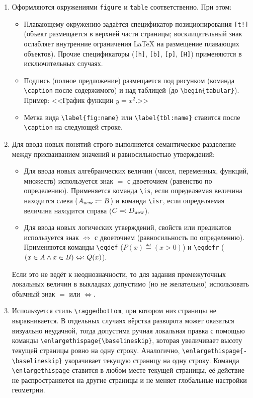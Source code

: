 \begin{enumerate}
    \item {}
        Оформляются окружениями \verb|figure| и \verb|table| соответственно.
        При этом:
        \begin{itemize}
            \item Плавающему окружению задаётся спецификатор позиционирования \verb|[t!]| (объект размещается в верхней части страницы; восклицательный знак ослабляет внутренние ограничения LaTeX на размещение плавающих объектов).
                Прочие спецификаторы (\verb|[h]|, \verb|[b]|, \verb|[p]|, \verb|[H]|) применяются в исключительных случаях.
            \item Подпись (полное предложение) размещается под рисунком (команда \verb|\caption| после содержимого) и над таблицей (до \verb|\begin{tabular}|).
                Пример: <<График функции $y = x^2$.>>
            \item Метка вида \verb|\label{fig:name}| или \verb|\label{tbl:name}| ставится после \verb|\caption| на следующей строке.
        \end{itemize}

    \item {}
        Для ввода новых понятий строго выполняется семантическое разделение между присваиванием значений и равносильностью утверждений:
        \begin{itemize}
            \item Для ввода новых алгебраических величин (чисел, переменных, функций, множеств) используется знак $=$ с двоеточием (равенство по определению).
                Применяется команда \verb|\is|, если определяемая величина находится слева ($A_{\mathrm{new}} \coloneqq B$) и команда \verb|\isr|, если определяемая величина находится справа ($C \eqqcolon D_{\mathrm{new}}$).
            \item Для ввода новых логических утверждений, свойств или предикатов используется знак $\Leftrightarrow$ с двоеточием (равносильность по определению).
                Применяются команды \verb|\eqdef| ($P(x) \eqdef (x > 0)$) и \verb|\eqdefr| ($(x \in A \land x \in B) \mathrel{\Leftrightarrow\vcentcolon} Q(x)$).
        \end{itemize}
        Если это не ведёт к неоднозначности, то для задания промежуточных локальных величин в выкладках допустимо (но не желательно) использовать обычный знак $=$ или $\Leftrightarrow$.

    \item {}
        Используется стиль \verb|\raggedbottom|, при котором низ страницы не выравнивается.
        В отдельных случаях вёрстка разворота может оказаться визуально неудачной, тогда допустима ручная локальная правка с помощью команды \verb|\enlargethispage{\baselineskip}|, которая увеличивает высоту текущей страницы ровно на одну строку.
        Аналогично, \verb|\enlargethispage{-\baselineskip}| укорачивает текущую страницу на одну строку.
        Команда \verb|\enlargethispage| ставится в любом месте текущей страницы, её действие не распространяется на другие страницы и не меняет глобальные настройки геометрии.


\end{enumerate}
